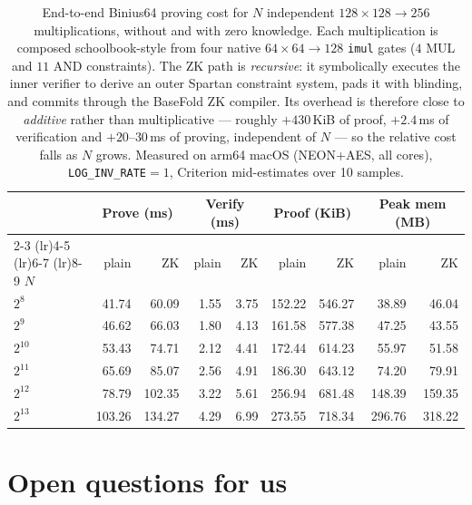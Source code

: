 \documentclass[11pt,letterpaper,usenames,dvipsnames]{article}
\begin{document}
\begin{table}[H]
  \centering
  \small
  \setlength{\tabcolsep}{4.5pt}
  \caption{End-to-end Binius64 proving cost for $N$ independent $128{\times}128{\to}256$
    multiplications, without and with zero knowledge. Each multiplication is composed
    schoolbook-style from four native $64{\times}64{\to}128$ \texttt{imul} gates ($4$ MUL and
    $11$ AND constraints). The ZK path is \emph{recursive}: it symbolically executes the inner
    verifier to derive an outer Spartan constraint system, pads it with blinding, and commits
    through the BaseFold ZK compiler. Its overhead is therefore close to \emph{additive} rather
    than multiplicative --- roughly $+430$\,KiB of proof, $+2.4$\,ms of verification and
    $+20$--$30$\,ms of proving, independent of $N$ --- so the relative cost falls as $N$ grows.
    Measured on arm64 macOS (NEON+AES, all cores), \texttt{LOG\_INV\_RATE}${}=1$, Criterion
    mid-estimates over 10 samples.}
  \label{tab:binius64-bignum128-zk}
  \begin{tabular}{@{}l rr rr rr rr@{}}
    \toprule
      & \multicolumn{2}{c}{Prove (ms)}
      & \multicolumn{2}{c}{Verify (ms)}
      & \multicolumn{2}{c}{Proof (KiB)}
      & \multicolumn{2}{c}{Peak mem (MB)} \\
    \cmidrule(lr){2-3} \cmidrule(lr){4-5} \cmidrule(lr){6-7} \cmidrule(lr){8-9}
    $N$ & plain & ZK & plain & ZK & plain & ZK & plain & ZK \\
    \midrule
    $2^{8}$  &  41.74 &  60.09 & 1.55 & 3.75 & 152.22 & 546.27 &  38.89 &  46.04 \\
    $2^{9}$  &  46.62 &  66.03 & 1.80 & 4.13 & 161.58 & 577.38 &  47.25 &  43.55 \\
    $2^{10}$ &  53.43 &  74.71 & 2.12 & 4.41 & 172.44 & 614.23 &  55.97 &  51.58 \\
    $2^{11}$ &  65.69 &  85.07 & 2.56 & 4.91 & 186.30 & 643.12 &  74.20 &  79.91 \\
    $2^{12}$ &  78.79 & 102.35 & 3.22 & 5.61 & 256.94 & 681.48 & 148.39 & 159.35 \\
    $2^{13}$ & 103.26 & 134.27 & 4.29 & 6.99 & 273.55 & 718.34 & 296.76 & 318.22 \\
    \bottomrule
  \end{tabular}
\end{table}
\section{Open questions for us}
\end{document}
